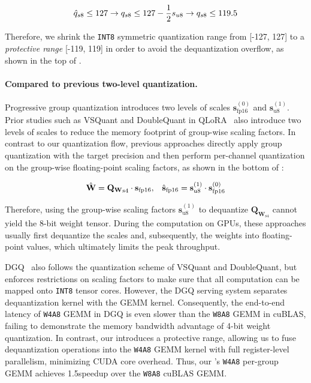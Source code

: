 \vspace{-18pt}
\begin{equation*}
    \small \hat{q}_{s8} \le 127  \rightarrow {q}_{s8} \le 127 - \frac{1}{2} {{s}_{u8}}  \rightarrow {q}_{s8} \le 119.5
\end{equation*}

\vspace{-10pt}
Therefore, we shrink the \texttt{INT8} symmetric quantization range from [-127, 127] to a \textit{protective range} [-119, 119] in order to avoid the dequantization overflow, as shown in the top of .

\paragraph{\textbf{Compared to previous two-level quantization.}} Progressive group quantization introduces two levels of scales $\mathbf{s}^{(0)}_{\mathrm{fp16}}$ and $\mathbf{s}^{(1)}_{\mathrm{u8}}$. Prior studies such as VSQuant and DoubleQuant in QLoRA~\cite{dettmers2023qlora} also introduce two levels of scales to reduce the memory footprint of group-wise scaling factors. In contrast to our quantization flow, previous approaches directly apply group quantization with the target precision and then perform per-channel quantization on the group-wise floating-point scaling factors, as shown in the bottom of :

\vspace{-12pt}
\begin{equation}
    \small \hat{\mathbf{W}} = {\mathbf{Q}_{\mathbf{W}}}_{\mathrm{s4}} \cdot \mathbf{s}_{\mathrm{fp16}}, \;\;\;\hat{\mathbf{s}}_{\mathrm{fp16}} = {\mathbf{s}}^{(1)}_{\mathrm{u8}} \cdot \mathbf{s}^{(0)}_{\mathrm{fp16}}
\end{equation}
\vspace{-15pt}


Therefore, using the group-wise scaling factors ${\mathbf{s}}^{(1)}_{\mathrm{u8}}$ to dequantize $\mathbf{Q}_{\mathbf{W}_{\mathrm{s4}}}$ cannot yield the 8-bit weight tensor. During the computation on GPUs, these approaches usually first dequantize the scales and, subsequently, the weights into floating-point values, which ultimately limits the peak throughput.

DGQ~\cite{zhang2023dual} also follows the quantization scheme of VSQuant and DoubleQuant, but enforces restrictions on scaling factors to make sure that all computation can be mapped onto \texttt{INT8} tensor cores. However, the DGQ serving system separates dequantization kernel with the GEMM kernel. Consequently, the end-to-end latency of \texttt{W4A8} GEMM in DGQ is even slower than the \texttt{W8A8} GEMM in cuBLAS, failing to demonstrate the memory bandwidth advantage of 4-bit weight quantization. In contrast, our \algo introduces a protective range, allowing us to fuse dequantization operations into the \texttt{W4A8} GEMM kernel with full register-level parallelism, minimizing CUDA core overhead. Thus, our \system's \texttt{W4A8} per-group GEMM achieves 1.5\x speedup over the \texttt{W8A8} cuBLAS GEMM.


